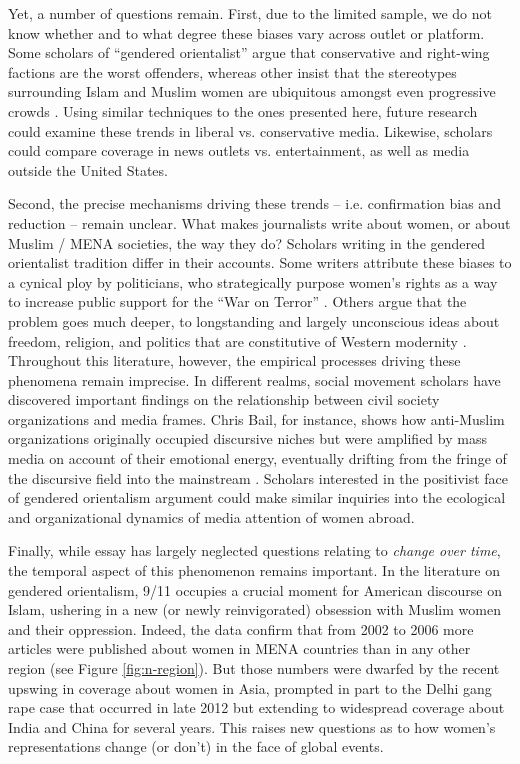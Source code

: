 \documentclass[11pt, oneside]{article}
\begin{document}
Yet, a number of questions remain. First, due to the limited sample, we do not know whether and to what degree these biases vary across outlet or platform. Some scholars of ``gendered orientalist'' argue that conservative and right-wing factions are the worst offenders, whereas other insist that the stereotypes surrounding Islam and Muslim women are ubiquitous amongst even progressive crowds \cite{kumar2012islamophobia}. Using similar techniques to the ones presented here, future research could examine these trends in liberal vs. conservative media. Likewise, scholars could compare coverage in news outlets vs. entertainment, as well as media outside the United States.

Second, the precise mechanisms driving these trends -- i.e. confirmation bias and reduction -- remain unclear. What makes journalists write about women, or about Muslim / MENA societies, the way they do? Scholars writing in the gendered orientalist tradition differ in their accounts. Some writers attribute these biases to a cynical ploy by politicians, who strategically purpose women's rights as a way to increase public support for the ``War on Terror'' \cite{stabile_unveiling_2005}. Others argue that the problem goes much deeper, to longstanding and largely unconscious ideas about freedom, religion, and politics that are constitutive of Western modernity \cite{massad2015islam}. Throughout this literature, however, the empirical processes driving these phenomena remain imprecise. In different realms, social movement scholars have discovered important findings on the relationship between civil society organizations and media frames. Chris Bail, for instance, shows how anti-Muslim organizations originally occupied discursive niches but were amplified by mass media on account of their emotional energy, eventually drifting from the fringe of the discursive field into the mainstream \citeyear{bail2012fringe}. Scholars interested in the positivist face of gendered orientalism argument could make similar inquiries into the ecological and organizational dynamics of media attention of women abroad. 

Finally, while essay has largely neglected questions relating to \emph{change over time}, the temporal aspect of this phenomenon remains important. In the literature on gendered orientalism, 9/11 occupies a crucial moment for American discourse on Islam, ushering in a new (or newly reinvigorated) obsession with Muslim women and their oppression. Indeed, the data confirm that from 2002 to 2006 more articles were published about women in MENA countries than in any other region (see Figure \ref{fig:n-region}). But those numbers were dwarfed by the recent upswing in coverage about women in Asia, prompted in part to the Delhi gang rape case that occurred in late 2012 but extending to widespread coverage about India and China for several years. This raises new questions as to how women's representations change (or don't) in the face of global events.

\newpage




\end{document}
